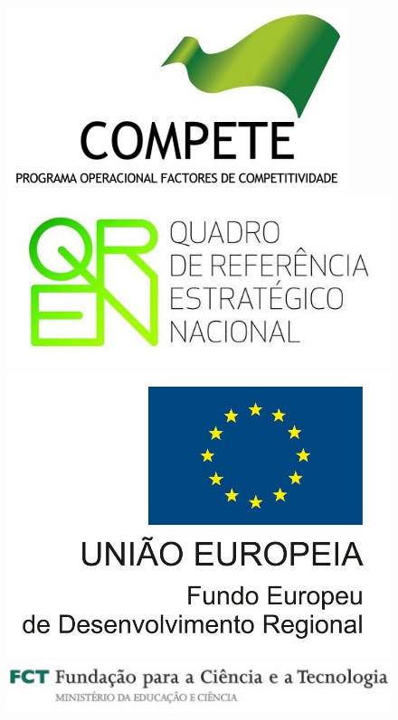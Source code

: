 \documentclass[a4paper, 12pt, oneside]{Thesis}  %
\begin{document}
\begin{figure}[htb]
\begin{minipage}[b]{0.24\linewidth}
\centering
	\includegraphics[width=\textwidth]{Images/logo.jpg}
\end{minipage}
\begin{minipage}[b]{0.24\linewidth}
\centering
	\includegraphics[width=\textwidth]{Images/logo2.jpg}
\end{minipage}
\begin{minipage}[b]{0.24\linewidth}
\centering
	\includegraphics[width=\textwidth]{Images/logo3.jpg}
\end{minipage}
\begin{minipage}[b]{0.24\linewidth}
\centering
	\includegraphics[width=\textwidth]{Images/logo4.jpg}
\end{minipage}

\end{figure}
\end{document}
